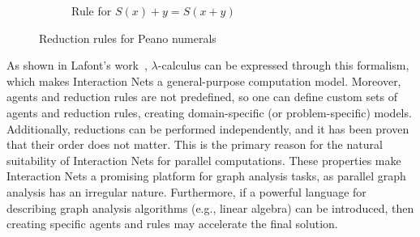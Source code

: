 \begin{figure}[htbp]
\begin{subfigure}[b]{0.45\textwidth}
{
}
\caption{ Rule for $S(x) + y = S(x + y)$}
\label{fig:peano_rules_x_y}
\end{subfigure}
\caption{Reduction rules for Peano numerals}
\label{fig:peano_rules}
\end{figure}

As shown in Lafont's work~\cite{10.1145/96709.96718}, $\lambda$-calculus can be expressed through this formalism, which makes Interaction Nets a general-purpose computation model.
Moreover, agents and reduction rules are not predefined, so one can define custom sets of agents and reduction rules, creating domain-specific (or problem-specific) models.
Additionally, reductions can be performed independently, and it has been proven that their order does not matter.
This is the primary reason for the natural suitability of Interaction Nets for parallel computations.
These properties make Interaction Nets a promising platform for graph analysis tasks, as parallel graph analysis has an irregular nature.
Furthermore, if a powerful language for describing graph analysis algorithms (e.g., linear algebra) can be introduced, then creating specific agents and rules may accelerate the final solution.

